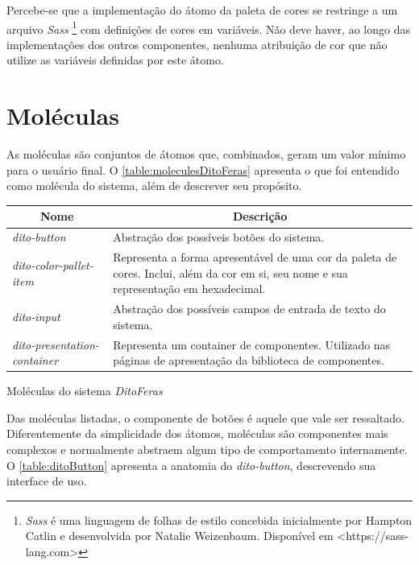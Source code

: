 Percebe-se que a implementação do átomo da paleta de cores se restringe a um arquivo \textit{Sass} \footnote{\textit{Sass} é uma linguagem de folhas de estilo concebida inicialmente por Hampton Catlin e desenvolvida por Natalie Weizenbaum. Disponível em <https://sass-lang.com>} com definições de cores em variáveis. Não deve haver, ao longo das implementações dos outros componentes, nenhuma atribuição de cor que não utilize as variáveis definidas por este átomo.

\section{Moléculas}

As moléculas são conjuntos de átomos que, combinados, geram um valor mínimo para o usuário final. O \autoref{table:moleculesDitoFeras} apresenta o que foi entendido como molécula do sistema, além de descrever seu propósito.

\begin{quadro}
\centering
\begin{tabular}{|m{4cm}|m{10cm}|} \hline
	
	\multicolumn{1}{|c|}{\bfseries Nome} & \multicolumn{1}{c|}{\bfseries Descrição} \\\hline
	
	 \textit{dito-button} & Abstração dos possíveis botões do sistema. \\\hline
	 
	 \textit{dito-color-pallet-item} & Representa a forma apresentável de uma cor da paleta de cores. Inclui, além da cor em si, seu nome e sua representação em hexadecimal. \\\hline
	 
	 \textit{dito-input} & Abstração dos possíveis campos de entrada de texto do sistema. \\\hline
	 
	 \textit{dito-presentation-container} & Representa um container de componentes. Utilizado nas páginas de apresentação da biblioteca de componentes. \\\hline
    
\end{tabular}
\caption{Moléculas do sistema \textit{DitoFeras}}
\label{table:moleculesDitoFeras}
\end{quadro}

Das moléculas listadas, o componente de botões é aquele que vale ser ressaltado. Diferentemente da simplicidade dos átomos, moléculas são componentes mais complexos e normalmente abstraem algum tipo de comportamento internamente. O \autoref{table:ditoButton} apresenta a anatomia do \textit{dito-button}, descrevendo sua interface de uso.


